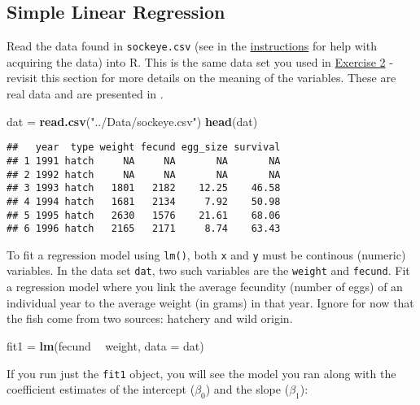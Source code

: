 \documentclass[]{book}
\newenvironment{Shaded}{\begin{snugshade}}{\end{snugshade}}
\newcommand{\KeywordTok}[1]{\textcolor[rgb]{0.13,0.29,0.53}{\textbf{#1}}}
\newcommand{\DataTypeTok}[1]{\textcolor[rgb]{0.13,0.29,0.53}{#1}}
\newcommand{\StringTok}[1]{\textcolor[rgb]{0.31,0.60,0.02}{#1}}
\newcommand{\OperatorTok}[1]{\textcolor[rgb]{0.81,0.36,0.00}{\textbf{#1}}}
\newcommand{\NormalTok}[1]{#1}
\theoremstyle{definition}
\theoremstyle{definition}
\theoremstyle{definition}
\theoremstyle{remark}
\begin{document}
\subsection{Simple Linear Regression}\label{regression}

Read the data found in \texttt{sockeye.csv} (see in the
\protect\hyperlink{data-sets}{instructions} for help with acquiring the
data) into R. This is the same data set you used in
\protect\hyperlink{ex2}{Exercise 2} - revisit this section for more
details on the meaning of the variables. These are real data and are
presented in \citet{sockeye-cite}.

\begin{Shaded}
\begin{Highlighting}[]
\NormalTok{dat =}\StringTok{ }\KeywordTok{read.csv}\NormalTok{(}\StringTok{"../Data/sockeye.csv"}\NormalTok{)}
\KeywordTok{head}\NormalTok{(dat)}
\end{Highlighting}
\end{Shaded}

\begin{verbatim}
##   year  type weight fecund egg_size survival
## 1 1991 hatch     NA     NA       NA       NA
## 2 1992 hatch     NA     NA       NA       NA
## 3 1993 hatch   1801   2182    12.25    46.58
## 4 1994 hatch   1681   2134     7.92    50.98
## 5 1995 hatch   2630   1576    21.61    68.06
## 6 1996 hatch   2165   2171     8.74    63.43
\end{verbatim}

To fit a regression model using \texttt{lm()}, both \texttt{x} and
\texttt{y} must be continous (numeric) variables. In the data set
\texttt{dat}, two such variables are the \texttt{weight} and
\texttt{fecund}. Fit a regression model where you link the average
fecundity (number of eggs) of an individual year to the average weight
(in grams) in that year. Ignore for now that the fish come from two
sources: hatchery and wild origin.

\begin{Shaded}
\begin{Highlighting}[]
\NormalTok{fit1 =}\StringTok{ }\KeywordTok{lm}\NormalTok{(fecund }\OperatorTok{~}\StringTok{ }\NormalTok{weight, }\DataTypeTok{data =}\NormalTok{ dat)}
\end{Highlighting}
\end{Shaded}

If you run just the \texttt{fit1} object, you will see the model you ran
along with the coefficient estimates of the intercept (\(\beta_0\)) and
the slope (\(\beta_1\)):
\end{document}
